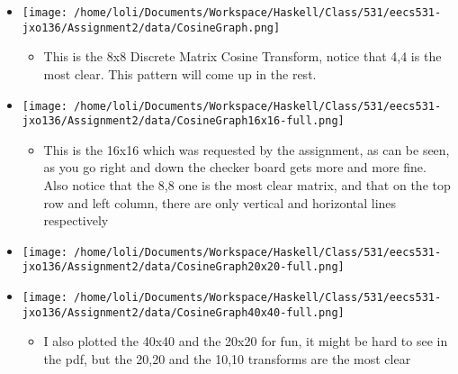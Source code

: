 \documentclass{article}
\begin{document}
\begin{itemize}
\begin{itemize}
\item \texttt{[image: /home/loli/Documents/Workspace/Haskell/Class/531/eecs531-jxo136/Assignment2/data/CosineGraph.png]}
\begin{itemize}
\item This is the 8x8 Discrete Matrix Cosine Transform, notice that 4,4
is the most clear. This pattern will come up in the rest.
\end{itemize}

\item \texttt{[image: /home/loli/Documents/Workspace/Haskell/Class/531/eecs531-jxo136/Assignment2/data/CosineGraph16x16-full.png]}

\begin{itemize}
\item This is the 16x16 which was requested by the assignment, as can
be seen, as you go right and down the checker board gets more and
more fine. Also notice that the 8,8 one is the most clear
matrix, and that on the top row and left column, there are only
vertical and horizontal lines respectively
\end{itemize}
\item \texttt{[image: /home/loli/Documents/Workspace/Haskell/Class/531/eecs531-jxo136/Assignment2/data/CosineGraph20x20-full.png]}
\item \texttt{[image: /home/loli/Documents/Workspace/Haskell/Class/531/eecs531-jxo136/Assignment2/data/CosineGraph40x40-full.png]}
\begin{itemize}
\item I also plotted the 40x40 and the 20x20 for fun, it might be hard
to see in the pdf, but the 20,20 and the 10,10 transforms are the
most clear
\end{itemize}
\end{itemize}
\end{itemize}
\end{document}
